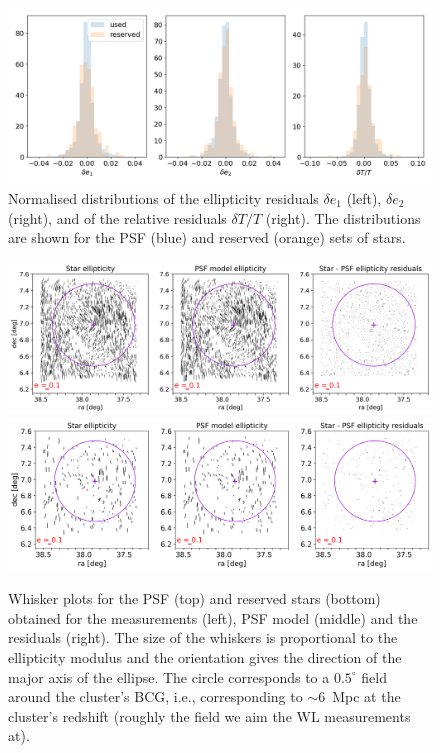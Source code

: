 \documentclass[SE,lsstdraft,authoryear,toc]{lsstdoc}
\begin{document}
\begin{figure}
\includegraphics[width=\textwidth]{Figures/residual_histograms.png}
\caption{Normalised distributions of the ellipticity residuals $\delta e_1$ (left), $\delta e_2$ (right), and of the relative residuals $\delta T/T$ (right). The distributions are shown for the PSF (blue) and reserved (orange) sets of stars. \label{fig:residual_distrib}}
\end{figure}


\begin{figure}
\includegraphics[width=\textwidth]{Figures/whiskers_used_big.png}
\includegraphics[width=\textwidth]{Figures/whiskers_reserved_big.png}
\caption{Whisker plots for the PSF (top) and reserved stars (bottom) obtained for the measurements (left), PSF model (middle) and the residuals (right). The size of the whiskers is proportional to the ellipticity modulus and the orientation gives the direction of the major axis of the ellipse. The circle corresponds to a $0.5^\circ$  field around the cluster’s BCG, i.e., corresponding to $\sim 6$~Mpc at the cluster's redshift (roughly the field we aim the WL measurements at).\label{fig:whiskers}}
\end{figure}
\end{document}
